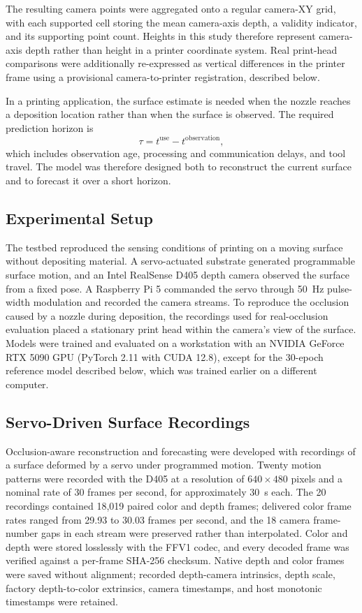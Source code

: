 The resulting camera points were aggregated onto a regular camera-XY grid, with each supported cell storing the mean camera-axis depth, a validity indicator, and its supporting point count. Heights in this study therefore represent camera-axis depth rather than height in a printer coordinate system. Real print-head comparisons were additionally re-expressed as vertical differences in the printer frame using a provisional camera-to-printer registration, described below.

In a printing application, the surface estimate is needed when the nozzle reaches a deposition location rather than when the surface is observed. The required prediction horizon is
\begin{equation}
    \tau = t^{\mathrm{use}}-t^{\mathrm{observation}},
\end{equation}
which includes observation age, processing and communication delays, and tool travel. The model was therefore designed both to reconstruct the current surface and to forecast it over a short horizon.

\subsection{Experimental Setup}
The testbed reproduced the sensing conditions of printing on a moving surface without depositing material. A servo-actuated substrate generated programmable surface motion, and an Intel RealSense D405 depth camera observed the surface from a fixed pose. A Raspberry Pi 5 commanded the servo through 50~Hz pulse-width modulation and recorded the camera streams. To reproduce the occlusion caused by a nozzle during deposition, the recordings used for real-occlusion evaluation placed a stationary print head within the camera's view of the surface. Models were trained and evaluated on a workstation with an NVIDIA GeForce RTX 5090 GPU (PyTorch 2.11 with CUDA 12.8), except for the 30-epoch reference model described below, which was trained earlier on a different computer.


\subsection{Servo-Driven Surface Recordings}
Occlusion-aware reconstruction and forecasting were developed with recordings of a surface deformed by a servo under programmed motion. Twenty motion patterns were recorded with the D405 at a resolution of $640 \times 480$ pixels and a nominal rate of 30 frames per second, for approximately 30~s each. The 20 recordings contained 18,019 paired color and depth frames; delivered color frame rates ranged from 29.93 to 30.03 frames per second, and the 18 camera frame-number gaps in each stream were preserved rather than interpolated. Color and depth were stored losslessly with the FFV1 codec, and every decoded frame was verified against a per-frame SHA-256 checksum. Native depth and color frames were saved without alignment; recorded depth-camera intrinsics, depth scale, factory depth-to-color extrinsics, camera timestamps, and host monotonic timestamps were retained.

